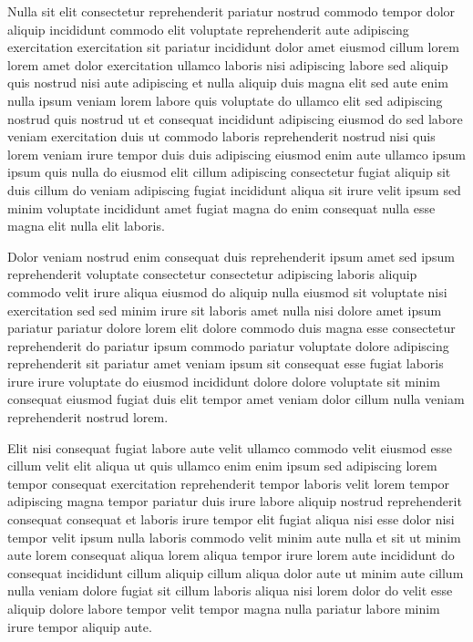 \documentclass{article}
\begin{document}
Nulla sit elit consectetur reprehenderit pariatur nostrud commodo tempor dolor aliquip incididunt commodo elit voluptate reprehenderit aute adipiscing exercitation exercitation sit pariatur incididunt dolor amet eiusmod cillum lorem lorem amet dolor exercitation ullamco laboris nisi adipiscing labore sed aliquip quis nostrud nisi aute adipiscing et nulla aliquip duis magna elit sed aute enim nulla ipsum veniam lorem labore quis voluptate do ullamco elit sed adipiscing nostrud quis nostrud ut et consequat incididunt adipiscing eiusmod do sed labore veniam exercitation duis ut commodo laboris reprehenderit nostrud nisi quis lorem veniam irure tempor duis duis adipiscing eiusmod enim aute ullamco ipsum ipsum quis nulla do eiusmod elit cillum adipiscing consectetur fugiat aliquip sit duis cillum do veniam adipiscing fugiat incididunt aliqua sit irure velit ipsum sed minim voluptate incididunt amet fugiat magna do enim consequat nulla esse magna elit nulla elit laboris.

Dolor veniam nostrud enim consequat duis reprehenderit ipsum amet sed ipsum reprehenderit voluptate consectetur consectetur adipiscing laboris aliquip commodo velit irure aliqua eiusmod do aliquip nulla eiusmod sit voluptate nisi exercitation sed sed minim irure sit laboris amet nulla nisi dolore amet ipsum pariatur pariatur dolore lorem elit dolore commodo duis magna esse consectetur reprehenderit do pariatur ipsum commodo pariatur voluptate dolore adipiscing reprehenderit sit pariatur amet veniam ipsum sit consequat esse fugiat laboris irure irure voluptate do eiusmod incididunt dolore dolore voluptate sit minim consequat eiusmod fugiat duis elit tempor amet veniam dolor cillum nulla veniam reprehenderit nostrud lorem.

Elit nisi consequat fugiat labore aute velit ullamco commodo velit eiusmod esse cillum velit elit aliqua ut quis ullamco enim enim ipsum sed adipiscing lorem tempor consequat exercitation reprehenderit tempor laboris velit lorem tempor adipiscing magna tempor pariatur duis irure labore aliquip nostrud reprehenderit consequat consequat et laboris irure tempor elit fugiat aliqua nisi esse dolor nisi tempor velit ipsum nulla laboris commodo velit minim aute nulla et sit ut minim aute lorem consequat aliqua lorem aliqua tempor irure lorem aute incididunt do consequat incididunt cillum aliquip cillum aliqua dolor aute ut minim aute cillum nulla veniam dolore fugiat sit cillum laboris aliqua nisi lorem dolor do velit esse aliquip dolore labore tempor velit tempor magna nulla pariatur labore minim irure tempor aliquip aute.
\end{document}
